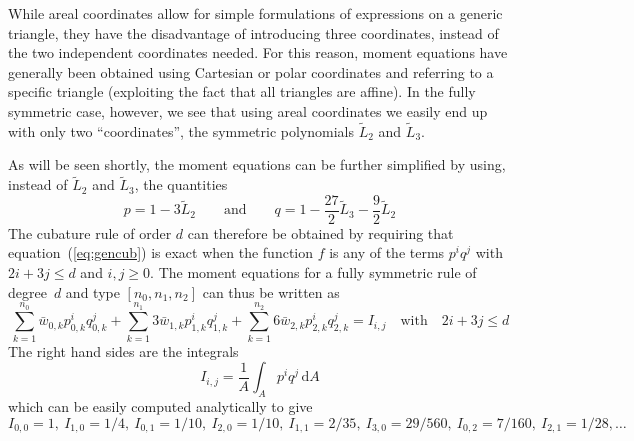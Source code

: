 \documentclass{article}
\begin{document}
While areal coordinates allow for simple formulations of expressions on a generic triangle, they have the disadvantage of introducing three coordinates, instead of the two independent coordinates needed. For this reason, moment equations have generally been obtained using Cartesian or polar coordinates and referring to a specific triangle (exploiting the fact that all triangles are affine). In the fully symmetric case, however, we see that using areal coordinates we easily end up with only two ``coordinates'', the symmetric polynomials $\tilde{L}_2$ and $\tilde{L}_3$.



As will be seen shortly, the moment equations can be further simplified by using, instead of $\tilde{L}_2$ and $\tilde{L}_3$, the quantities
\begin{equation}
  \label{eq:pqdef}
  p = 1-3 \tilde{L}_2 \qquad \text{and}
  \qquad
  q = 1 - \frac{27}{2} \tilde{L}_3 - \frac{9}{2} \tilde{L}_2
\end{equation}
The cubature rule of order $d$ can therefore be obtained by requiring that equation~(\ref{eq:gencub}) is exact when the function $f$ is any of the terms $p^i q^j$ with $2 i + 3 j \leq d$ and $i,j \geq 0$.
The moment equations for a fully symmetric rule of degree~$d$ and type $[n_0,n_1,n_2]$ can thus be written as
\begin{equation}
  \label{eq:eqs6gen}
  \sum_{k=1}^{n_0}   \bar{w}_{0,k} p_{0,k}^i q_{0,k}^j +
  \sum_{k=1}^{n_1} 3 \bar{w}_{1,k} p_{1,k}^i q_{1,k}^j +
  \sum_{k=1}^{n_2} 6 \bar{w}_{2,k} p_{2,k}^i q_{2,k}^j
   = I_{i,j} \quad\text{with}\quad 2i+3j \leq d
\end{equation}
The right hand sides are the integrals
\begin{equation}
  I_{i,j} =  \frac{1}{A} \int_A p^i q^j  \,\mathrm{d} A
\end{equation}
which can be easily computed analytically to give
\begin{equation}
  I_{0,0} = 1,\: I_{1,0} = 1/4,\: I_{0,1} = 1/10,\: I_{2,0} = 1/10,\: I_{1,1} = 2/35,\: I_{3,0} = 29/560,\: I_{0,2} = 7/160,\: I_{2,1} = 1/28, \ldots
\end{equation}
\end{document}
